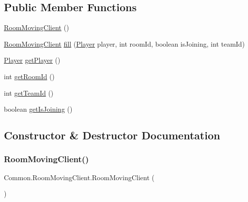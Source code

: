 \subsection*{Public Member Functions}
\begin{DoxyCompactItemize}
\item 
\mbox{\hyperlink{classCommon_1_1RoomMovingClient_a447754b3da2c6ac8cd32b2a6f490ef6c}{Room\+Moving\+Client}} ()
\item 
\mbox{\hyperlink{classCommon_1_1RoomMovingClient}{Room\+Moving\+Client}} \mbox{\hyperlink{classCommon_1_1RoomMovingClient_a4bb429f47a0b7574d223bbe63aaeb096}{fill}} (\mbox{\hyperlink{classCommon_1_1Player}{Player}} player, int room\+Id, boolean is\+Joining, int team\+Id)
\item 
\mbox{\hyperlink{classCommon_1_1Player}{Player}} \mbox{\hyperlink{classCommon_1_1RoomMovingClient_a7e9f5ba38fba3138d8b7438be1a834f0}{get\+Player}} ()
\item 
int \mbox{\hyperlink{classCommon_1_1RoomMovingClient_a81d463606183e832672ec00b25c07088}{get\+Room\+Id}} ()
\item 
int \mbox{\hyperlink{classCommon_1_1RoomMovingClient_afdc28b796ecc99d62049c98fb53cef72}{get\+Team\+Id}} ()
\item 
boolean \mbox{\hyperlink{classCommon_1_1RoomMovingClient_a386ca7363315be9857c0c841d41d13a1}{get\+Is\+Joining}} ()
\end{DoxyCompactItemize}


\subsection{Constructor \& Destructor Documentation}
\mbox{\label{classCommon_1_1RoomMovingClient_a447754b3da2c6ac8cd32b2a6f490ef6c}} 
\subsubsection{\texorpdfstring{Room\+Moving\+Client()}{RoomMovingClient()}}
{\footnotesize\ttfamily Common.\+Room\+Moving\+Client.\+Room\+Moving\+Client (\begin{DoxyParamCaption}{ }\end{DoxyParamCaption})\hspace{0.3cm}{\ttfamily [inline]}}




